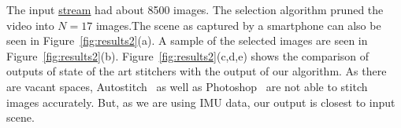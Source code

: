 \documentclass[10pt,twocolumn,letterpaper]{article}
\begin{document}
The input \href{videos/purpleRed.avi}{stream} had about 8500 images. The
selection algorithm pruned the video into $N=17$ images.The scene as captured by a smartphone can also be seen in
Figure~\ref{fig:results2}(a). A sample of the
selected images are seen in Figure~\ref{fig:results2}(b).
Figure~\ref{fig:results2}(c,d,e) shows the comparison of outputs of state
of the art stitchers with the output of our algorithm. As there are vacant
spaces, Autostitch~\cite{autostitch} as well as Photoshop~\cite{photoshop} are
not able to stitch images accurately. But, as we are using IMU data, our output is closest to input scene.
	

	
\end{document}
